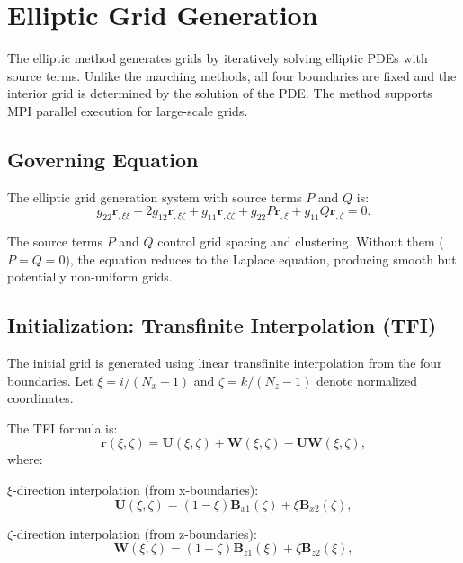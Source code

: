 \documentclass[11pt,a4paper]{report}
\newcommand{\rvec}{\bm{r}}
\begin{document}
\chapter{Elliptic Grid Generation}

The elliptic method generates grids by iteratively solving elliptic PDEs with source terms. Unlike the marching methods, all four boundaries are fixed and the interior grid is determined by the solution of the PDE. The method supports MPI parallel execution for large-scale grids.

\section{Governing Equation}

The elliptic grid generation system with source terms $P$ and $Q$ is:
\begin{equation}
    g_{22} \rvec_{,\xi\xi} - 2g_{12} \rvec_{,\xi\zeta} + g_{11} \rvec_{,\zeta\zeta} + g_{22} P \rvec_{,\xi} + g_{11} Q \rvec_{,\zeta} = 0.
    \label{eq:ellip-gov}
\end{equation}

The source terms $P$ and $Q$ control grid spacing and clustering. Without them ($P = Q = 0$), the equation reduces to the Laplace equation, producing smooth but potentially non-uniform grids.

\section{Initialization: Transfinite Interpolation (TFI)}

The initial grid is generated using linear transfinite interpolation from the four boundaries. Let $\xi = i/(N_x-1)$ and $\zeta = k/(N_z-1)$ denote normalized coordinates.

The TFI formula is:
\begin{equation}
    \rvec(\xi, \zeta) = \bm{U}(\xi, \zeta) + \bm{W}(\xi, \zeta) - \bm{UW}(\xi, \zeta),
\end{equation}
where:

$\xi$-direction interpolation (from x-boundaries):
\begin{equation}
    \bm{U}(\xi, \zeta) = (1-\xi) \bm{B}_{x1}(\zeta) + \xi \bm{B}_{x2}(\zeta),
\end{equation}

$\zeta$-direction interpolation (from z-boundaries):
\begin{equation}
    \bm{W}(\xi, \zeta) = (1-\zeta) \bm{B}_{z1}(\xi) + \zeta \bm{B}_{z2}(\xi),
\end{equation}
\end{document}
